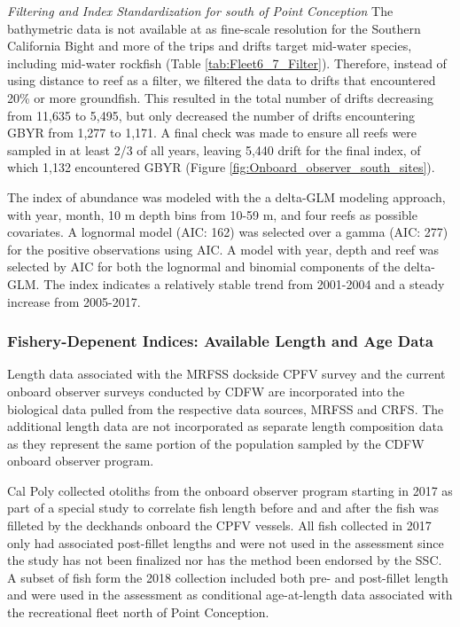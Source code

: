 \documentclass[12pt,]{article}
\begin{document}
\emph{Filtering and Index Standardization for south of Point Conception}
The bathymetric data is not available at as fine-scale resolution for
the Southern California Bight and more of the trips and drifts target
mid-water species, including mid-water rockfish (Table
\ref{tab:Fleet6_7_Filter}). Therefore, instead of using distance to reef
as a filter, we filtered the data to drifts that encountered 20\% or
more groundfish. This resulted in the total number of drifts decreasing
from 11,635 to 5,495, but only decreased the number of drifts
encountering GBYR from 1,277 to 1,171. A final check was made to ensure
all reefs were sampled in at least 2/3 of all years, leaving 5,440 drift
for the final index, of which 1,132 encountered GBYR (Figure
\ref{fig:Onboard_observer_south_sites}).

The index of abundance was modeled with the a delta-GLM modeling
approach, with year, month, 10 m depth bins from 10-59 m, and four reefs
as possible covariates. A lognormal model (AIC: 162) was selected over a
gamma (AIC: 277) for the positive observations using AIC. A model with
year, depth and reef was selected by AIC for both the lognormal and
binomial components of the delta-GLM. The index indicates a relatively
stable trend from 2001-2004 and a steady increase from 2005-2017.

\subsubsection{Fishery-Depenent Indices: Available Length and Age
Data}\label{fishery-depenent-indices-available-length-and-age-data}

Length data associated with the MRFSS dockside CPFV survey and the
current onboard observer surveys conducted by CDFW are incorporated into
the biological data pulled from the respective data sources, MRFSS and
CRFS. The additional length data are not incorporated as separate length
composition data as they represent the same portion of the population
sampled by the CDFW onboard observer program.

Cal Poly collected otoliths from the onboard observer program starting
in 2017 as part of a special study to correlate fish length before and
and after the fish was filleted by the deckhands onboard the CPFV
vessels. All fish collected in 2017 only had associated post-fillet
lengths and were not used in the assessment since the study has not been
finalized nor has the method been endorsed by the SSC. A subset of fish
form the 2018 collection included both pre- and post-fillet length and
were used in the assessment as conditional age-at-length data associated
with the recreational fleet north of Point Conception.
\end{document}
